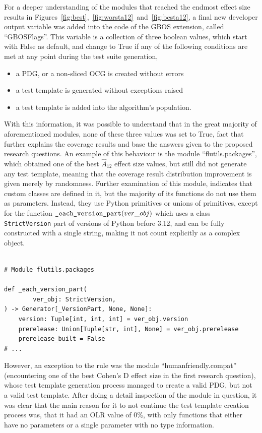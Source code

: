 \documentclass[%
  chapterprefix=false,%
  open=right,%
  twoside=true,%
  paper=a4,%
  logofile={Figures/logo.png},%
  thesistype=master,%
  UKenglish,%
]{se2thesis}
\newcommand{\classname}[1]{\texttt{#1}}
\newcommand{\callable}[2][]{\(\text{\texttt{#2}}(#1)\)}
\begin{document}
For a deeper understanding of the modules that reached the endmost effect size results in Figures~\ref{fig:best},~\ref{fig:worsta12}~and~\ref{fig:besta12}, a final new developer output variable was added into the code of the GBOS extension, called ``GBOSFlags''.
This variable is a collection of three boolean values, which start with False as default, and change to True if any of the following conditions are met at any point during the test suite generation,
\begin{itemize}
  \item a PDG, or a non-sliced OCG is created without errors
  \item a test template is generated without exceptions raised
  \item a test template is added into the algorithm's population.
\end{itemize}
With this information, it was possible to understand that in the great majority of aforementioned modules, none of these three values was set to True, fact that further explains the coverage results and base the answers given to the proposed research questions.
An example of this behaviour is the module ``flutils.packages'', which obtained one of the best \(\hat{A}_{12}\) effect size values, but still did not generate any test template, meaning that the coverage result distribution improvement is given merely by randomness.
Further examination of this module, indicates that custom classes are defined in it, but the majority of its functions do not use them as parameters.
Instead, they use Python primitives or unions of primitives, except for the function \callable[ver\_obj]{\_each\_version\_part} which uses a class \classname{StrictVersion} part of versions of Python before 3.12, and can be fully constructed with a single string, making it not count explicitly as a complex object.

\begin{verbatim}

# Module flutils.packages

def _each_version_part(
        ver_obj: StrictVersion,
) -> Generator[_VersionPart, None, None]:
    version: Tuple[int, int, int] = ver_obj.version
    prerelease: Union[Tuple[str, int], None] = ver_obj.prerelease
    prerelease_built = False
# ...
\end{verbatim}

However, an exception to the rule was the module ``humanfriendly.compat'' (encountering one of the best Cohen's D effect size in the first research question), whose test template generation process managed to create a valid PDG, but not a valid test template.
After doing a detail inspection of the module in question, it was clear that the main reason for it to not continue the test template creation process was, that it had an OLR value of \(0\%\), with only functions that either have no parameters or a single parameter with no type information.
\end{document}
